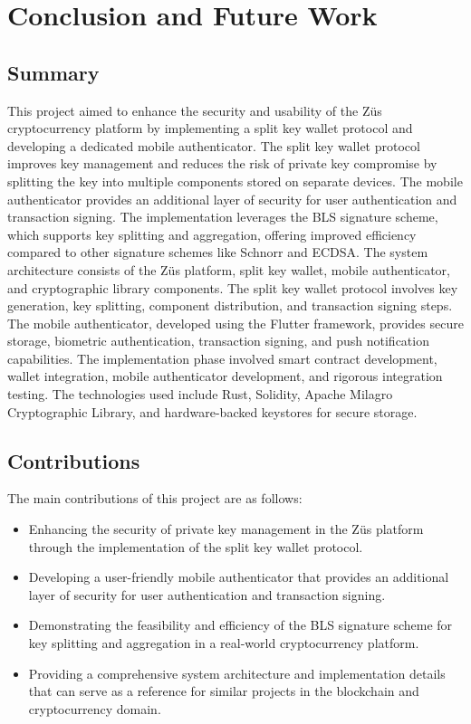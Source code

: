 \chapter{Conclusion and Future Work} %
\label{Chapter5} %
\section{Summary}
This project aimed to enhance the security and usability of the Züs cryptocurrency platform by implementing a split key wallet protocol and developing a dedicated mobile authenticator. The split key wallet protocol improves key management and reduces the risk of private key compromise by splitting the key into multiple components stored on separate devices. The mobile authenticator provides an additional layer of security for user authentication and transaction signing.
The implementation leverages the BLS signature scheme, which supports key splitting and aggregation, offering improved efficiency compared to other signature schemes like Schnorr and ECDSA. The system architecture consists of the Züs platform, split key wallet, mobile authenticator, and cryptographic library components.
The split key wallet protocol involves key generation, key splitting, component distribution, and transaction signing steps. The mobile authenticator, developed using the Flutter framework, provides secure storage, biometric authentication, transaction signing, and push notification capabilities.
The implementation phase involved smart contract development, wallet integration, mobile authenticator development, and rigorous integration testing. The technologies used include Rust, Solidity, Apache Milagro Cryptographic Library, and hardware-backed keystores for secure storage.
\section{Contributions}
The main contributions of this project are as follows:
\begin{itemize}
\item Enhancing the security of private key management in the Züs platform through the implementation of the split key wallet protocol.
\item Developing a user-friendly mobile authenticator that provides an additional layer of security for user authentication and transaction signing.
\item Demonstrating the feasibility and efficiency of the BLS signature scheme for key splitting and aggregation in a real-world cryptocurrency platform.
\item Providing a comprehensive system architecture and implementation details that can serve as a reference for similar projects in the blockchain and cryptocurrency domain.
\end{itemize}
